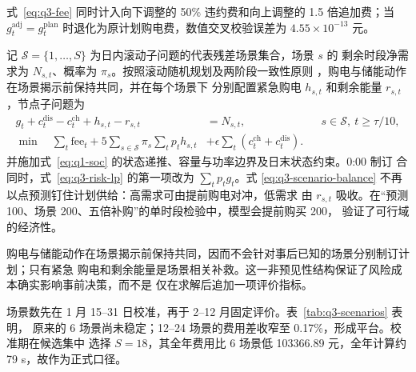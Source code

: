 \documentclass[withoutpreface,bwprint]{cumcmthesis}
\begin{document}
式~\eqref{eq:q3-fee} 同时计入向下调整的 50\% 违约费和向上调整的 1.5 倍追加费；当
$g^{\mathrm{adj}}_t=g^{\mathrm{plan}}_t$ 时退化为原计划购电费，数值交叉校验误差为
$4.55\times10^{-13}$ 元。

记 $\mathcal S=\{1,\ldots,S\}$ 为日内滚动子问题的代表残差场景集合，场景 $s$ 的
剩余时段净需求为 $N_{s,t}$、概率为 $\pi_s$。按照滚动随机规划及两阶段一致性原则
\cite{silvente2015,birge2011}，购电与储能动作在场景揭示前保持共同，并在每个场景下
分别配置紧急购电 $h_{s,t}$ 和剩余能量 $r_{s,t}$，节点子问题为
\begin{align}
 g_t+c_t^{\mathrm{dis}}-c_t^{\mathrm{ch}}+h_{s,t}-r_{s,t}
 &=N_{s,t}, &&s\in\mathcal S,\ t\ge\tau/10,
 \label{eq:q3-scenario-balance}\\
 \min\quad \sum_t\mathrm{fee}_t+5\sum_{s\in\mathcal S}\pi_s\sum_tp_th_{s,t}
 &+\epsilon\sum_t(c_t^{\mathrm{ch}}+c_t^{\mathrm{dis}}). \label{eq:q3-risk-lp}
\end{align}
并施加式~\eqref{eq:q1-soc} 的状态递推、容量与功率边界及日末状态约束。0:00 制订
合同时，式~\eqref{eq:q3-risk-lp} 的第一项改为 $\sum_tp_tg_t$。式
\eqref{eq:q3-scenario-balance} 不再以点预测钉住计划供给：高需求可由提前购电对冲，低需求
由 $r_{s,t}$ 吸收。在“预测 100、场景 200、五倍补购”的单时段检验中，模型会提前购买 200，
验证了可行域的经济性。

购电与储能动作在场景揭示前保持共同，因而不会针对事后已知的场景分别制订计划；只有紧急
购电和剩余能量是场景相关补救。这一非预见性结构保证了风险成本确实影响事前决策，而不是
仅在求解后追加一项评价指标。

场景数先在 1 月 15--31 日校准，再于 2--12 月固定评价。表~\ref{tab:q3-scenarios} 表明，
原来的 6 场景尚未稳定；12--24 场景的费用差收窄至 0.17\%，形成平台。校准期在候选集中
选择 $S=18$，其全年费用比 6 场景低 \num{103366.89} 元，全年计算约 79 s，故作为正式口径。

\begin{table}[H]
  \centering
  \caption{问题三代表场景数的评价期稳定性}
  \label{tab:q3-scenarios}
  \small
\end{table}
\end{document}
